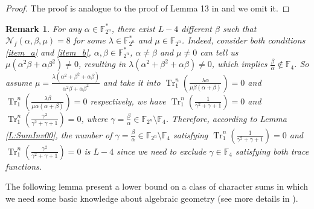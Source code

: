 \documentclass{article}
\newcommand{\F}{\mathbb{F}}
\newcommand{\0}{\textbf{0}}
\newcommand{\1}{\textbf{1}}
\newcommand{\TrN}{\operatorname{Tr}_1^n}
\theoremstyle{plain}
\newtheorem{remark}{Remark}
\begin{document}
    \begin{proof}
        The proof is analogue to the proof of Lemma 13 in \cite{tang2022invfunc} and we omit it.
    \end{proof}
    \begin{remark}
        For any $\alpha\in\F_{2^n}^*$, there exist $L-4$ different $\beta$
        such that $\mathcal{N}_f(\alpha,\beta,\mu)=8$ for some $\lambda\in\F_{2^n}^*$ and $\mu\in\F_{2^n}$.
        Indeed, consider both conditions \ref{item_a} and \ref{item_b}, $\alpha,\beta\in\F_{2^n}^*$, $\alpha\ne\beta$ and $\mu\ne 0$
        can tell us $\mu(\alpha^2\beta+\alpha\beta^2)\ne 0$,
        resulting in $\lambda(\alpha^2+\beta^2+\alpha\beta)\ne 0$,
        which implies $\frac{\beta}{\alpha}\notin\F_4$.
        So assume $\mu=\frac{\lambda(\alpha^2+\beta^2+\alpha\beta)}{\alpha^2\beta+\alpha\beta^2}$ and take it
        into $\TrN\left(\frac{\lambda \alpha}{\mu \beta(\alpha+\beta)}\right)=0$
        and $\TrN\left(\frac{\lambda \beta}{\mu \alpha(\alpha+\beta)}\right)=0$ respectively,
        we have $\TrN\left(\frac{1}{\gamma^2+\gamma+1}\right)=0$ and $\TrN\left(\frac{\gamma^2}{\gamma^2+\gamma+1}\right)=0$,
        where $\gamma=\frac{\beta}{\alpha}\in\F_{2^n}\setminus\F_{4}$.
        Therefore, according to Lemma \ref{L:SumInv00},
        the number of $\gamma=\frac{\beta}{\alpha}\in\F_{2^n}\setminus\F_{4}$ satisfying
        $\TrN\left(\frac{1}{\gamma^2+\gamma+1}\right)=0$ and $\TrN\left(\frac{\gamma^2}{\gamma^2+\gamma+1}\right)=0$
        is $L-4$ since we need to exclude $\gamma\in\F_4$ satisfying both trace functions.
    \end{remark}


The following lemma present a lower bound on a class of character sums in which we need some basic knowledge
about  algebraic geometry (see more details in \cite{Stichtenoth2008book_algebraicfunctionfieldsandcodes}).
\end{document}

